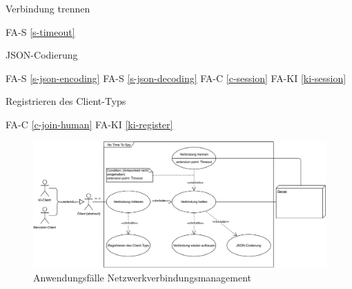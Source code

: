 Verbindung trennen

FA-S \ref{s-timeout} %

JSON-Codierung

FA-S \ref{s-json-encoding} %
FA-S \ref{s-json-decoding} %
FA-C \ref{c-session} %
FA-KI \ref{ki-session} %

Registrieren des Client-Typs

FA-C \ref{c-join-human} %
FA-KI \ref{ki-register} %

\begin{figure}
  \centering
  \includegraphics[width=\textwidth]{Meilenstein02/use_case_network.pdf}
  \caption{Anwendungsfälle Netzwerkverbindungsmanagement}
\end{figure}